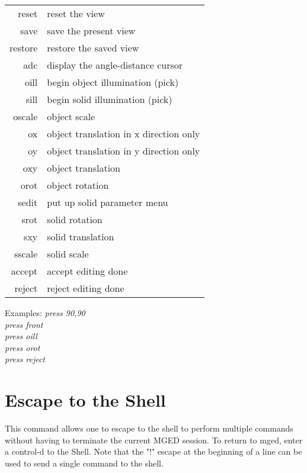 \begin{tabular}{rl}
       reset         & reset the view \\
       save          & save the present view \\
       restore       & restore the saved view \\
       adc           & display the angle-distance cursor \\
       oill          & begin object illumination (pick) \\
       sill          & begin solid illumination (pick) \\
       oscale        & object scale \\
       ox            & object translation in x direction only \\
       oy            & object translation in y direction only \\
       oxy           & object translation \\
       orot          & object rotation \\
       sedit         & put up solid parameter menu \\
       srot          & solid rotation \\
       sxy           & solid translation \\
       sscale        & solid scale \\
       accept        & accept editing done \\
       reject        & reject editing done \\
\end{tabular}

Examples:
{\em
         press 90,90 \\
         press front \\
         press oill \\
         press orot \\
         press reject \\
}

\section{Escape to the Shell}

{\em\center
%
}

This command allows one to escape to the shell to perform multiple commands
without having to terminate the current MGED session.
To return to mged, enter a control-d to the Shell.
Note that the "!" escape at the beginning of a line can be used
to send a single command to the shell.

